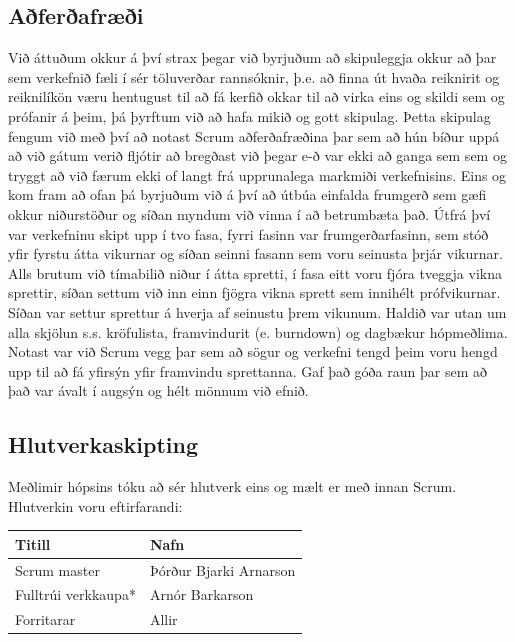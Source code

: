 \documentclass{article}
\begin{document}
\subsection{Aðferðafræði}

Við áttuðum okkur á því strax þegar við byrjuðum að skipuleggja okkur að þar sem verkefnið fæli í sér töluverðar rannsóknir, þ.e. að finna út hvaða reiknirit og reiknilíkön væru hentugust til að fá kerfið okkar til að virka eins og skildi sem og prófanir á þeim, þá þyrftum við að hafa mikið og gott skipulag. Þetta skipulag fengum við með því að notast Scrum aðferðafræðina þar sem að hún bíður uppá að við gátum verið fljótir að bregðast við þegar e-ð var ekki að ganga sem sem og tryggt að við færum ekki of langt frá upprunalega markmiði verkefnisins. 
Eins og kom fram að ofan þá byrjuðum við á því að útbúa einfalda frumgerð sem gæfi okkur niðurstöður og síðan myndum við vinna í að betrumbæta það. Útfrá því var verkefninu skipt upp í tvo fasa, fyrri fasinn var frumgerðarfasinn, sem stóð yfir fyrstu átta vikurnar og síðan seinni fasann sem voru seinusta þrjár vikurnar. Alls brutum við tímabilið niður í átta spretti, í fasa eitt voru fjóra tveggja vikna sprettir, síðan settum við inn einn fjögra vikna sprett sem innihélt prófvikurnar. Síðan var settur sprettur á hverja af seinustu þrem vikunum.
Haldið var utan um alla skjölun s.s. kröfulista, framvindurit (e. burndown) og dagbækur hópmeðlima. Notast var við Scrum vegg þar sem að sögur og verkefni tengd þeim voru hengd upp til að fá yfirsýn yfir framvindu sprettanna. Gaf það góða raun þar sem að það var ávalt í augsýn og hélt mönnum við efnið.

\subsection{Hlutverkaskipting}

Meðlimir hópsins tóku að sér hlutverk eins og mælt er með innan Scrum. Hlutverkin voru eftirfarandi:

\vspace{5 mm}
\begin{tabular}{| l | l |}
\hline
Titill & Nafn \\
\hline
Scrum master & Þórður Bjarki Arnarson\\
\hline
Fulltrúi verkkaupa* & Arnór Barkarson \\
\hline
Forritarar & Allir \\
\hline
\end{tabular}
\vspace{5 mm}
\end{document}
